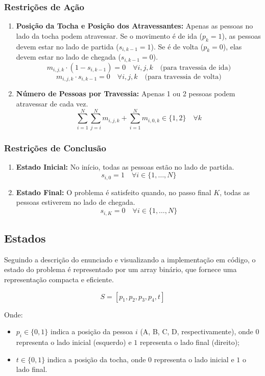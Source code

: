 \documentclass[12pt,a4paper]{article}
\begin{document}
\subsubsection*{Restrições de Ação}
\begin{enumerate}
    \item \textbf{Posição da Tocha e Posição dos Atravessantes:} Apenas as pessoas no lado da tocha podem atravessar. Se o movimento é de ida ($p_k=1$), as pessoas devem estar no lado de partida ($s_{i,k-1}=1$). Se é de volta ($p_k=0$), elas devem estar no lado de chegada ($s_{i,k-1}=0$).
    $$
    m_{i,j,k} \cdot (1 - s_{i,k-1}) = 0 \quad \forall i, j, k \quad \text{(para travessia de ida)}
    $$
    $$
    m_{i,j,k} \cdot s_{i,k-1} = 0 \quad \forall i, j, k \quad \text{(para travessia de volta)}
    $$
    \item \textbf{Número de Pessoas por Travessia:} Apenas 1 ou 2 pessoas podem atravessar de cada vez.
    $$
    \sum_{i=1}^{N} \sum_{j=i}^{N} m_{i,j,k} + \sum_{i=1}^{N} m_{i,0,k} \in \{1, 2\} \quad \forall k
    $$
\end{enumerate}

\subsubsection*{Restrições de Conclusão}
\begin{enumerate}
    \item \textbf{Estado Inicial:} No início, todas as pessoas estão no lado de partida.
    $$
    s_{i,0} = 1 \quad \forall i \in \{1, \dots, N\}
    $$
    \item \textbf{Estado Final:} O problema é satisfeito quando, no passo final $K$, todas as pessoas estiverem no lado de chegada.
    $$
    s_{i,K} = 0 \quad \forall i \in \{1, \dots, N\}
    $$
\end{enumerate}

\subsection{Estados}
Seguindo a descrição do enunciado e visualizando a implementação em código, o estado do problema é representado por um array binário, que fornece uma representação compacta e eficiente.

\[
S = [p_1, p_2, p_3, p_4, t]
\]

Onde:
\begin{itemize}
    \item $p_i \in \{0, 1\}$ indica a posição da pessoa $i$ (A, B, C, D, respectivamente), onde $0$ representa o lado inicial (esquerdo) e $1$ representa o lado final (direito);
    \item $t \in \{0, 1\}$ indica a posição da tocha, onde $0$ representa o lado inicial e $1$ o lado final.
\end{itemize}
\end{document}
